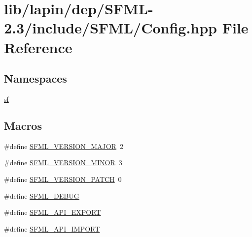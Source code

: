 \hypertarget{lapin_2dep_2_s_f_m_l-2_83_2include_2_s_f_m_l_2_config_8hpp}{\section{lib/lapin/dep/\-S\-F\-M\-L-\/2.3/include/\-S\-F\-M\-L/\-Config.hpp File Reference}
\label{lapin_2dep_2_s_f_m_l-2_83_2include_2_s_f_m_l_2_config_8hpp}
}
\subsection*{Namespaces}
\begin{DoxyCompactItemize}
\item 
\hyperlink{namespacesf}{sf}
\end{DoxyCompactItemize}
\subsection*{Macros}
\begin{DoxyCompactItemize}
\item 
\#define \hyperlink{lapin_2dep_2_s_f_m_l-2_83_2include_2_s_f_m_l_2_config_8hpp_ab601e78ee9806b7ef75b242681af3bf2}{S\-F\-M\-L\-\_\-\-V\-E\-R\-S\-I\-O\-N\-\_\-\-M\-A\-J\-O\-R}~2
\item 
\#define \hyperlink{lapin_2dep_2_s_f_m_l-2_83_2include_2_s_f_m_l_2_config_8hpp_a91a4f1f9aeae335e13bb4cfa8f018865}{S\-F\-M\-L\-\_\-\-V\-E\-R\-S\-I\-O\-N\-\_\-\-M\-I\-N\-O\-R}~3
\item 
\#define \hyperlink{lapin_2dep_2_s_f_m_l-2_83_2include_2_s_f_m_l_2_config_8hpp_acccd4412c83e570fbc4d1d5638b035b3}{S\-F\-M\-L\-\_\-\-V\-E\-R\-S\-I\-O\-N\-\_\-\-P\-A\-T\-C\-H}~0
\item 
\#define \hyperlink{lapin_2dep_2_s_f_m_l-2_83_2include_2_s_f_m_l_2_config_8hpp_a90cd534d01b83efcf7e6769551c2a3db}{S\-F\-M\-L\-\_\-\-D\-E\-B\-U\-G}
\item 
\#define \hyperlink{lapin_2dep_2_s_f_m_l-2_83_2include_2_s_f_m_l_2_config_8hpp_ab2d9ba01221055369f9707a4d7b528c2}{S\-F\-M\-L\-\_\-\-A\-P\-I\-\_\-\-E\-X\-P\-O\-R\-T}
\item 
\#define \hyperlink{lapin_2dep_2_s_f_m_l-2_83_2include_2_s_f_m_l_2_config_8hpp_aba0bbe5791bee6633caa835c7f6a12a4}{S\-F\-M\-L\-\_\-\-A\-P\-I\-\_\-\-I\-M\-P\-O\-R\-T}
\end{DoxyCompactItemize}
